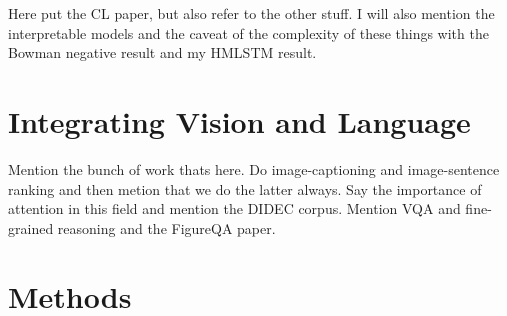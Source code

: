 Here put the CL paper, but also refer to the other stuff. I will also mention the interpretable models and the caveat of the complexity of these things with the Bowman negative result and my HMLSTM result.

\section{Integrating Vision and Language}
Mention the bunch of work thats here. Do image-captioning and image-sentence ranking and then metion that we do the latter always. Say the importance of attention in this field and mention the DIDEC corpus. Mention VQA and fine-grained reasoning and the FigureQA paper.  



\section{Methods}


